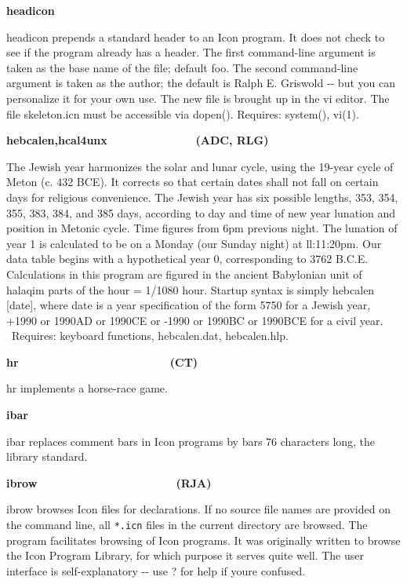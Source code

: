 {{\sffamily\bfseries
headicon\ \ \ \ \ \ \ \ \ \ \ \ \ \ \ \ \ \ \ \ }

\textsf{headicon} prepends a standard header to an Icon program. It does
not check to see if the program already has a header. The first
command-line argument is taken as the base name of the file; default
{\textquotedbl}foo{\textquotedbl}. The second command-line argument is
taken as the author; the default is \textsf{{\textquotedbl}Ralph E.
Griswold{\textquotedbl}} -{}- but you can personalize it for your own
use. The new file is brought up in the vi editor. The
file \textsf{skeleton.icn} must be accessible via \textsf{dopen()}.
Requires: system(), vi(1).

{\sffamily\bfseries
hebcalen,hcal4unx\ \ \ \ \ \ \ \ \ \ \ \ \ \ (ADC, RLG)}

The Jewish year harmonizes the solar and lunar cycle, using the 19-year
cycle of Meton (c. 432 BCE). It corrects so that certain dates shall
not fall on certain days for religious convenience. The Jewish year has
six possible lengths, 353, 354, 355, 383, 384, and 385 days, according
to day and time of new year lunation and position in Metonic cycle.
Time figures from 6pm previous night. The lunation of year 1 is
calculated to be on a Monday (our Sunday night) at ll:11:20pm. Our data
table begins with a hypothetical year 0, corresponding to 3762 B.C.E.
Calculations in this program are figured in the ancient Babylonian unit
of halaqim {\textquotedbl}parts{\textquotedbl} of the hour = 1/1080
hour. Startup syntax is simply \textsf{hebcalen [date]}, where
\textsf{date} is a year specification of the form 5750 for a Jewish
year, +1990 or 1990AD or 1990CE or -1990 or 1990BC or 1990BCE for a
civil year. \ Requires: keyboard functions,
\textsf{hebcalen.dat}, \textsf{hebcalen.hlp}.

{\sffamily\bfseries
hr\ \ \ \ \ \ \ \ \ \ \ \ \ \ \ \ \ \ \ \ \ \  \ \ (CT)}

\textsf{hr} implements a horse-race game.

{\sffamily\bfseries
ibar\ \ \ \ \ \ \ \ \ \ \ \ \ \ \ \ \ \ \ \ \ \ }

\textsf{ibar} replaces comment bars in Icon programs by
bars 76 characters long, the library standard. 

{\sffamily\bfseries
ibrow\ \ \ \ \ \ \ \ \ \ \ \ \ \ \ \ \ \ \ \ \ \ (RJA)}

\textsf{ibrow} browses Icon files for declarations. If no source file
names are provided on the command line, all \texttt{*.icn} files in the
current directory are browsed. The program facilitates browsing of Icon
programs. It was originally written to browse the Icon Program Library,
for which purpose it serves quite well. The user interface is
self-explanatory -{}- use {\textquotedbl}?{\textquotedbl} for help if
you{\textquotesingle}re confused.

}
